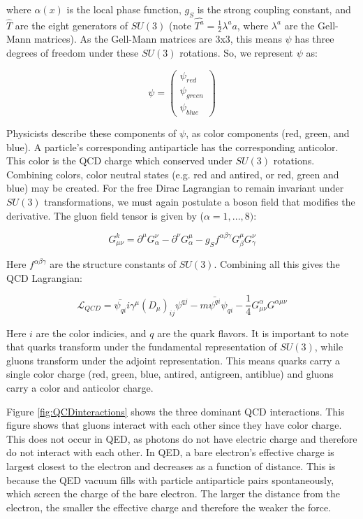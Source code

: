 where $\alpha(x)$ is the local phase function, $g_{S}$ is the strong coupling constant, and $\hat{T}$ are the eight generators of $SU(3)$ (note $\hat{T^{a}}=\frac{1}{2}\lambda^{a} a$, where $\lambda^{a}$ are the Gell-Mann matrices). As the Gell-Mann matrices are 3x3, this means $\psi$ has three degrees of freedom under these $SU(3)$ rotations. So, we represent $\psi$ as:

\begin{equation}
\psi = \begin{pmatrix} \psi_{red} \\ \psi_{green} \\ \psi_{blue}\end{pmatrix}
\end{equation}

Physicists describe these components of $\psi$, as color components (red, green, and blue). A particle's corresponding antiparticle has the corresponding anticolor. This color is the QCD charge which conserved under $SU(3)$ rotations. Combining colors, color neutral states (e.g. red and antired, or red, green and blue) may be created.
For the free Dirac Lagrangian to remain invariant under $SU(3)$ transformations, we must again postulate a boson field that modifies the derivative. The gluon field tensor is given by ($\alpha=1,...,8)$:

\begin{equation}
G_{\mu\nu}^{k}  = \partial^{\mu}G^{\nu}_{\alpha}-\partial^{\nu}G^{\mu}_{\alpha}-g_{S}f^{\alpha\beta\gamma}G^{\mu}_{\beta}G^{\nu}_{\gamma}
\end{equation}

Here $f^{\alpha\beta\gamma}$ are the structure constants of $SU(3)$. Combining all this gives the QCD Lagrangian:

\begin{equation}
\mathcal{L}_{QCD} = \bar{\psi_{qi}}i\gamma^{\mu} (D_{\mu})_{ij}\psi^{qj} - m\bar{\psi^{qi}}\psi_{qi} - \frac{1}{4}G^{\alpha}_{\mu\nu}G^{\alpha\mu\nu} 
\end{equation}

Here $i$ are the color indicies, and $q$ are the quark flavors. It is important to note that quarks transform under the fundamental representation of $SU(3)$, while gluons transform under the adjoint representation. This means quarks carry a single color charge (red, green, blue, antired, antigreen, antiblue) and gluons carry a color and anticolor charge. 

Figure \ref{fig:QCDinteractions} shows the three dominant QCD interactions. This figure shows that gluons interact with each other since they have color charge. This does not occur in QED, as photons do not have electric charge and therefore do not interact with each other. In QED, a bare electron's effective charge is largest closest to the electron and decreases as a function of distance. This is because the QED vacuum fills with particle antiparticle pairs spontaneously, which screen the charge of the bare electron. The larger the distance from the electron, the smaller the effective charge and therefore the weaker the force. 

